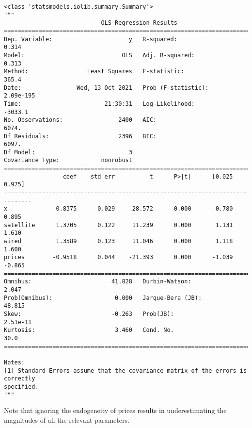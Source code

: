             \begin{tcolorbox}[breakable, size=fbox, boxrule=.5pt, pad at break*=1mm, opacityfill=0]
\begin{Verbatim}[commandchars=\\\{\}]
<class 'statsmodels.iolib.summary.Summary'>
"""
                            OLS Regression Results
==============================================================================
Dep. Variable:                      y   R-squared:                       0.314
Model:                            OLS   Adj. R-squared:                  0.313
Method:                 Least Squares   F-statistic:                     365.4
Date:                Wed, 13 Oct 2021   Prob (F-statistic):          2.09e-195
Time:                        21:30:31   Log-Likelihood:                -3033.1
No. Observations:                2400   AIC:                             6074.
Df Residuals:                    2396   BIC:                             6097.
Df Model:                           3
Covariance Type:            nonrobust
==============================================================================
                 coef    std err          t      P>|t|      [0.025      0.975]
------------------------------------------------------------------------------
x              0.8375      0.029     28.572      0.000       0.780       0.895
satellite      1.3705      0.122     11.239      0.000       1.131       1.610
wired          1.3589      0.123     11.046      0.000       1.118       1.600
prices        -0.9518      0.044    -21.393      0.000      -1.039      -0.865
==============================================================================
Omnibus:                       41.828   Durbin-Watson:                   2.047
Prob(Omnibus):                  0.000   Jarque-Bera (JB):               48.815
Skew:                          -0.263   Prob(JB):                     2.51e-11
Kurtosis:                       3.460   Cond. No.                         30.0
==============================================================================

Notes:
[1] Standard Errors assume that the covariance matrix of the errors is correctly
specified.
"""
\end{Verbatim}
\end{tcolorbox}

    Note that ignoring the endogeneity of prices results in underestimating
the magnitudes of all the relevant parameters.

